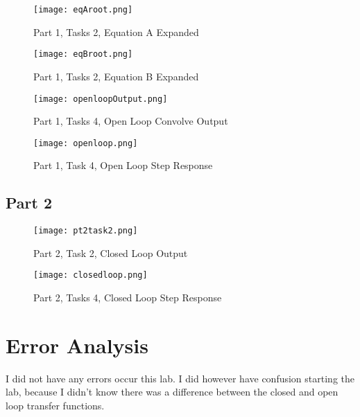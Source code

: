 \documentclass[12pt]{report}
\begin{document}
\begin{figure}[H]
\begin{center}
\caption{Part 1, Tasks 2, Equation A Expanded}
\texttt{[image: eqAroot.png]}
\end{center}
\end{figure}

\begin{figure}[H]
\begin{center}
\caption{Part 1, Tasks 2, Equation B Expanded}
\texttt{[image: eqBroot.png]}
\end{center}
\end{figure}

\begin{figure}[H]
\begin{center}
\caption{Part 1, Tasks 4, Open Loop Convolve Output}
\texttt{[image: openloopOutput.png]}
\end{center}
\end{figure}

\begin{figure}[H]
\begin{center}
\caption{Part 1, Task 4, Open Loop Step Response}
\texttt{[image: openloop.png]}
\end{center}
\end{figure}

\subsection{Part 2}
\begin{figure}[H]
\begin{center}
\caption{Part 2, Task 2, Closed Loop Output}
\texttt{[image: pt2task2.png]}
\end{center}
\end{figure}

\begin{figure}[H]
\begin{center}
\caption{Part 2, Tasks 4, Closed Loop Step Response}
\texttt{[image: closedloop.png]}
\end{center}
\end{figure}


\section{Error Analysis}
I did not have any errors occur this lab. I did however have confusion
starting the lab, because I didn't know there was a difference
between the closed and open loop transfer functions. 
\end{document}
